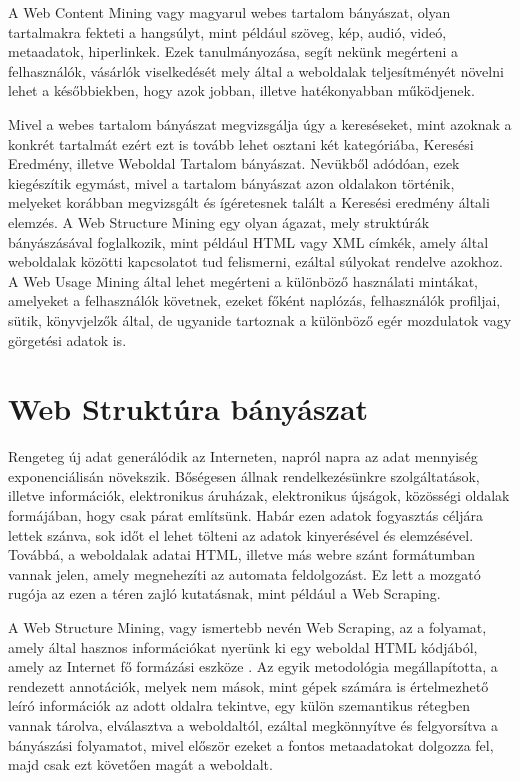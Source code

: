 A Web Content Mining vagy magyarul webes tartalom bányászat, olyan tartalmakra fekteti a hangsúlyt, mint például szöveg, kép, audió, videó, metaadatok, hiperlinkek. Ezek tanulmányozása, segít nekünk megérteni a felhasználók, vásárlók viselkedését mely által a weboldalak teljesítményét növelni lehet a későbbiekben, hogy azok jobban, illetve hatékonyabban működjenek. 

Mivel a webes tartalom bányászat megvizsgálja úgy a kereséseket, mint azoknak a konkrét tartalmát ezért ezt is tovább lehet osztani két kategóriába, Keresési Eredmény, illetve Weboldal Tartalom bányászat. Nevükből adódóan, ezek kiegészítik egymást, mivel a tartalom bányászat azon oldalakon történik, melyeket korábban megvizsgált és ígéretesnek talált a Keresési eredmény általi elemzés. A Web Structure Mining egy olyan ágazat, mely struktúrák bányászásával foglalkozik, mint például HTML vagy XML címkék, amely által weboldalak közötti kapcsolatot tud felismerni, ezáltal súlyokat rendelve azokhoz. A Web Usage Mining által lehet megérteni a különböző használati mintákat, amelyeket a felhasználók követnek, ezeket főként naplózás, felhasználók profiljai, sütik, könyvjelzők által, de ugyanide tartoznak a különböző egér mozdulatok vagy görgetési adatok is.

\section{Web Struktúra bányászat}

Rengeteg új adat generálódik az Interneten, napról napra az adat mennyiség exponenciálisán növekszik. Bőségesen állnak rendelkezésünkre szolgáltatások, illetve információk, elektronikus áruházak, elektronikus újságok, közösségi oldalak formájában, hogy csak párat említsünk. Habár ezen adatok fogyasztás céljára lettek szánva, sok időt el lehet tölteni az adatok kinyerésével és elemzésével. Továbbá, a weboldalak adatai HTML, illetve más webre szánt formátumban vannak jelen, amely megnehezíti az automata feldolgozást. Ez lett a mozgató rugója az ezen a téren zajló kutatásnak, mint például a Web Scraping.

A Web Structure Mining, vagy ismertebb nevén Web Scraping, az a folyamat, amely által hasznos információkat nyerünk ki egy weboldal HTML kódjából, amely az Internet fő formázási eszköze \cite{dastidar2016intelligent}. Az egyik metodológia megállapította, a rendezett annotációk, melyek nem mások, mint gépek számára is értelmezhető leíró információk az adott oldalra tekintve, egy külön szemantikus rétegben vannak tárolva, elválasztva a weboldaltól, ezáltal megkönnyítve és felgyorsítva a bányászási folyamatot, mivel először ezeket a fontos metaadatokat dolgozza fel, majd csak ezt követően magát a weboldalt.

